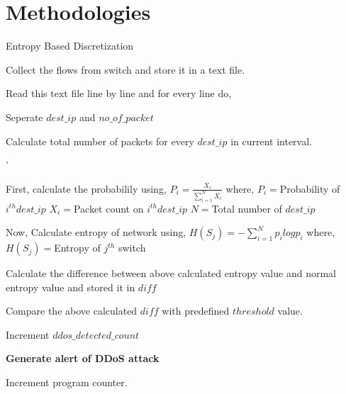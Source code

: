 \documentclass[12pt,a4paper,final]{report}
\begin{document}
\section{Methodologies}
\begin{algorithm}
\caption{Entropy Based Discretization}
\begin{algorithmic}[1]


\State Collect the flows from switch and store it in a text file.

\State Read this text file line by line and for every line do,

\State Seperate $dest\_ip$ and $no\_of\_packet$

\State Calculate total number of packets for every $dest\_ip$ in current interval.

\EndFunction

'

\State First, calculate the probabilily using,
$P_{i} = \frac{X_{i}}{\sum_{i=1}^{N} X_{i}} $
\newline
\hspace*{1cm}
where, 
\newline
\hspace*{1cm}
$P_{i} = $Probability of $i^{th} dest\_ip $
\newline
\hspace*{1cm}
$X_{i} = $Packet count on $i^{th} dest\_ip$
\newline
\hspace*{1cm}
$N = $Total number of $ dest\_ip$

\State Now, Calculate entropy of network using, 
$H(S_{j}) = -\sum_{i=1}^{N} p_{i} log p_{i} $
\newline
\hspace*{1cm}
where, 
\newline
\hspace*{1cm}
$H(S_{j}) = $Entropy of $j^{th} $ switch

\State Calculate the difference between above calculated entropy value and normal entropy value and stored it in $diff$

\EndFunction


\State Compare the above calculated $diff$ with predefined $threshold$ value.

\State Increment $ddos\_detected\_count$ 

        \State \textbf{Generate alert of DDoS attack}
    \EndIf

\Else
\State Increment program counter.

\EndIf

\EndFunction


\end{algorithmic}
\end{algorithm}
\end{document}
